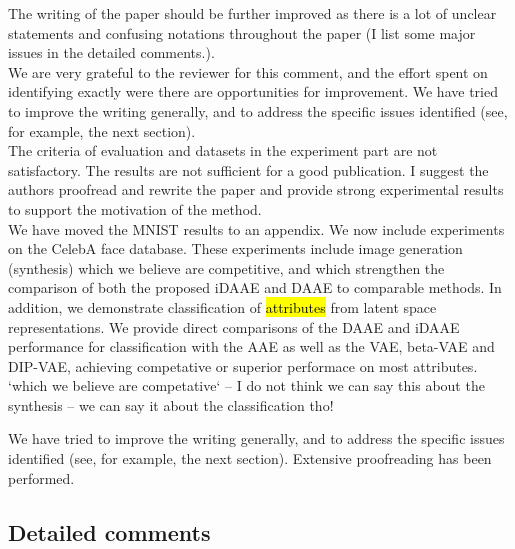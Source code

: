 \documentclass{article}
\begin{document}

{\color{blue} The writing of the paper should be further improved as there is a lot of unclear statements and confusing notations throughout the paper (I list some major issues in the detailed comments.).} \\

We are very grateful to the reviewer for this comment, and the effort spent on identifying exactly were there are opportunities for improvement. We have tried to improve the writing generally, and to address the specific issues identified (see, for example, the next section). \\

{\color{blue} The criteria of evaluation and datasets in the experiment part are not satisfactory. The results are not sufficient for a good publication. I suggest the authors proofread and rewrite the paper and provide strong experimental results to support the motivation of the method.}\\

We have {\color{red} moved} the MNIST results to an appendix. We now include experiments on the CelebA face database.  These experiments include image generation (synthesis) which we believe are competitive, and which strengthen the comparison of both the proposed iDAAE and DAAE to comparable methods. In addition, we demonstrate classification of \hl{attributes} from latent space representations. We provide direct comparisons of the DAAE and iDAAE performance for classification with the AAE {\color{red} as well as the VAE, beta-VAE and DIP-VAE, achieving competative or superior performace on most attributes}.\\

{\color{red} `which we believe are competative` -- I do not think we can say this about the synthesis -- we can say it about the classification tho!}

We have tried to improve the writing generally, and to address the specific issues identified (see, for example, the next section). Extensive proofreading has been performed.

\subsection*{Detailed comments}
\end{document}
